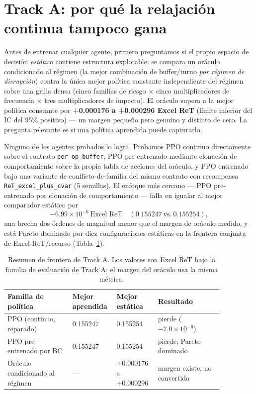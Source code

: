 \documentclass[11pt]{article}
\begin{document}
\section{Track A: por qué la relajación continua tampoco gana}
\label{sec:tracka}

Antes de entrenar cualquier agente, primero preguntamos si el propio
espacio de decisión \emph{estático} contiene estructura explotable: se
compara un oráculo condicionado al régimen (la mejor combinación de
buffer/turno \emph{por régimen de disrupción}) contra la única mejor
política constante independiente del régimen sobre una grilla densa (cinco
familias de riesgo $\times$ cinco multiplicadores de frecuencia $\times$
tres multiplicadores de impacto). El oráculo supera a la mejor política
constante por \textbf{+0.000176 a +0.000296 Excel ReT} (límite inferior
del IC del 95\% positivo) --- un margen pequeño pero genuino y distinto de
cero. La pregunta relevante es si una política aprendida puede capturarlo.

Ninguno de los agentes probados lo logra. Probamos PPO continuo
directamente sobre el contrato \texttt{per\_op\_buffer}, PPO
pre-entrenado mediante clonación de comportamiento sobre la propia tabla
de acciones del oráculo, y PPO entrenado bajo una variante de
conflicto-de-familia del mismo contrato con recompensa
\texttt{ReT\_excel\_plus\_cvar} (5 semillas). El enfoque más cercano ---
PPO pre-entrenado por clonación de comportamiento --- falla en igualar al
mejor comparador estático por
\[
-6.99\times10^{-6}\ \text{Excel ReT} \quad (0.155247\ \text{vs.}\ 0.155254),
\]
una brecha dos órdenes de magnitud menor que el margen de oráculo medido,
y está Pareto-dominado por diez configuraciones estáticas en la frontera
conjunta de Excel ReT/recurso (Tabla~\ref{tab:tracka}).

\begin{table}[htbp]
\centering
\caption{Resumen de frontera de Track A. Los valores son Excel ReT bajo la
familia de evaluación de Track A; el margen del oráculo usa la misma
métrica.}
\label{tab:tracka}
\small
\begin{tabular}{p{0.28\linewidth}p{0.14\linewidth}p{0.16\linewidth}p{0.28\linewidth}}
\toprule
Familia de política & Mejor aprendida & Mejor estática & Resultado \\
\midrule
PPO (continuo, reparado) & 0.155247 & 0.155254 & pierde ($-7.0\times10^{-6}$) \\
PPO pre-entrenado por BC & 0.155247 & 0.155254 & pierde; Pareto-dominado \\
Oráculo condicionado al régimen & --- & $+0.000176$ a $+0.000296$ &
margen existe, no convertido \\
\bottomrule
\end{tabular}
\end{table}
\end{document}
